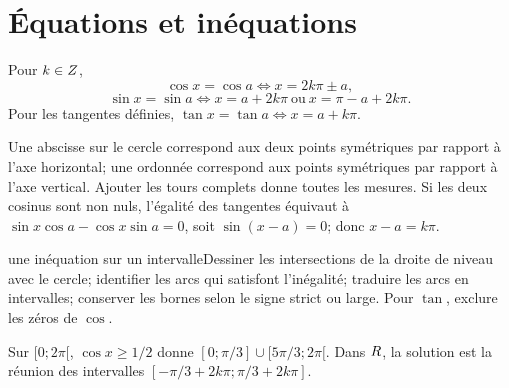 \section{Équations et inéquations}
\begin{propriete}Pour $k\in Z$,
\[
\cos x=\cos a\Leftrightarrow x=2k\pi\pm a,
\]
\[
\sin x=\sin a\Leftrightarrow x=a+2k\pi\ \text{ou}\ x=\pi-a+2k\pi.
\]
Pour les tangentes définies, $\tan x=\tan a\Leftrightarrow x=a+k\pi$.
\end{propriete}
\begin{demonstration}Une abscisse sur le cercle correspond aux deux points symétriques par rapport à l’axe horizontal; une ordonnée correspond aux points symétriques par rapport à l’axe vertical. Ajouter les tours complets donne toutes les mesures. Si les deux cosinus sont non nuls, l’égalité des tangentes équivaut à $\sin x\cos a-\cos x\sin a=0$, soit $\sin(x-a)=0$; donc $x-a=k\pi$.\end{demonstration}
\begin{methode}{une inéquation sur un intervalle}Dessiner les intersections de la droite de niveau avec le cercle; identifier les arcs qui satisfont l’inégalité; traduire les arcs en intervalles; conserver les bornes selon le signe strict ou large. Pour $\tan$, exclure les zéros de $\cos$.\end{methode}
\begin{exemple}Sur $[0;2\pi[$, $\cos x\ge1/2$ donne $[0;\pi/3]\cup[5\pi/3;2\pi[$. Dans $R$, la solution est la réunion des intervalles $[-\pi/3+2k\pi;\pi/3+2k\pi]$.\end{exemple}


